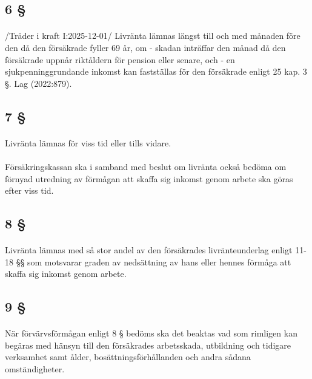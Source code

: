 \documentclass[a4paper,notitlepage,openany,10pt]{book}
\begin{document}
\subsection*{6 §}
\paragraph*{}
/Träder i kraft I:2025-12-01/
Livränta lämnas längst till och med månaden före den då den försäkrade fyller 69 år, om
\newline - skadan inträffar den månad då den försäkrade uppnår riktåldern för pension eller senare, och
\newline - en sjukpenninggrundande inkomst kan fastställas för den försäkrade enligt 25 kap. 3 §.
Lag (2022:879).
\subsection*{7 §}
\paragraph*{}
Livränta lämnas för viss tid eller tills vidare.
\paragraph*{}
Försäkringskassan ska i samband med beslut om livränta också bedöma om förnyad utredning av förmågan att skaffa sig inkomst genom arbete ska göras efter viss tid.
\subsection*{8 §}
\paragraph*{}
Livränta lämnas med så stor andel av den försäkrades livränteunderlag enligt 11-18 §§ som motsvarar graden av nedsättning av hans eller hennes förmåga att skaffa sig inkomst genom arbete.
\subsection*{9 §}
\paragraph*{}
När förvärvsförmågan enligt 8 § bedöms ska det beaktas vad som rimligen kan begäras med hänsyn till den försäkrades arbetsskada, utbildning och tidigare verksamhet samt ålder, bosättningsförhållanden och andra sådana omständigheter.
\end{document}
